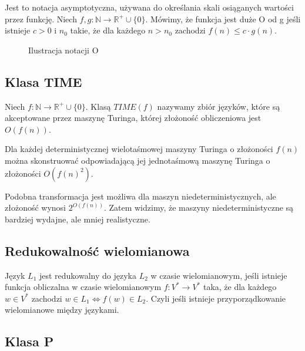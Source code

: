 \documentclass{../notatki}
\begin{document}
Jest to notacja asymptotyczna, używana do określania skali osiąganych wartości
przez funkcję. Niech $f, g: \mathbb{N} \rightarrow \mathbb{R}^+ \cup \{0\}$.
Mówimy, że funkcja jest duże O od g jeśli istnieje $c > 0$ i $n_0$ takie, że
dla każdego $n > n_0$ zachodzi $f(n) \le c \cdot g(n)$.

\begin{figure*}[h]
  \centering
  \caption{Ilustracja notacji O}
\end{figure*}

\subsection{Klasa TIME}

Niech $f: \mathbb{N} \rightarrow \mathbb{R}^+ \cup \{0\}$. Klasą $TIME(f)$
nazywamy zbiór języków, które są akceptowane przez maszynę Turinga, której
złożoność obliczeniowa jest $O(f(n))$.

Dla każdej deterministycznej wielotaśmowej maszyny Turinga o złożoności $f(n)$
można skonstruować odpowiadającą jej jednotaśmową maszynę Turinga o złożoności
$O(f(n)^2)$.

Podobna transformacja jest możliwa dla maszyn niedeterministycznych, ale
złożoność wynosi $2^{O(f(n))}$. Zatem widzimy, że maszyny niedeterministyczne
są bardziej wydajne, ale mniej realistyczne.

\subsection{Redukowalność wielomianowa}

Język $L_1$ jest redukowalny do języka $L_2$ w czasie wielomianowym, jeśli
istnieje funkcja obliczalna w czasie wielomianowym $f: V^*
\rightarrow V^*$ taka,
że dla każdego $w \in V^*$ zachodzi $w \in L_1 \Leftrightarrow f(w) \in L_2$.
Czyli jeśli istnieje przyporządkowanie wielomianowe między językami.

\subsection{Klasa P}
\end{document}
